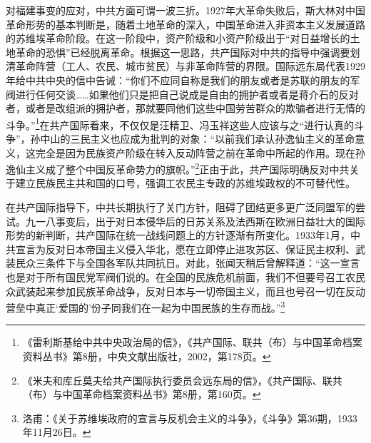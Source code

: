 对福建事变的应对，中共方面可谓一波三折。1927年大革命失败后，斯大林对中国革命形势的基本判断是，随着土地革命的深入，中国革命进入非资本主义发展道路的苏维埃革命阶段。在这一阶段中，资产阶级和小资产阶级出于“对日益增长的土地革命的恐惧”已经脱离革命。根据这一思路，共产国际对中共的指导中强调要划清革命阵营（工人、农民、城市贫民）与非革命阵营的界限。国际远东局代表1929年给中共中央的信中告诫：“你们不应同自称是我们的朋友或者是苏联的朋友的军阀进行任何交谈……如果他们只是把自己说成是自由的拥护者或者是蒋介石的反对者，或者是改组派的拥护者，那就要同他们这些中国劳苦群众的欺骗者进行无情的斗争。”\footnote{《雷利斯基给中共中央政治局的信》，《共产国际、联共（布）与中国革命档案资料丛书》第8册，中央文献出版社，2002，第178页。}在共产国际看来，不仅仅是汪精卫、冯玉祥这些人应该与之“进行认真的斗争”，孙中山的三民主义也应成为批判的对象：“以前我们承认孙逸仙主义的革命意义，这完全是因为民族资产阶级在转入反动阵营之前在革命中所起的作用。现在孙逸仙主义成了整个中国反革命势力的旗帜。”\footnote{《米夫和库丘莫夫给共产国际执行委员会远东局的信》，《共产国际、联共（布）与中国革命档案资料丛书》第8册，第160页。}正由于此，共产国际明确反对中共关于建立民族民主共和国的口号，强调工农民主专政的苏维埃政权的不可替代性。


在共产国际指导下，中共长期执行了关门方针，阻碍了团结更多更广泛同盟军的尝试。九一八事变后，出于对日本侵华后的日苏关系及法西斯在欧洲日益壮大的国际形势的新判断，共产国际在统一战线问题上的方针逐渐有所变化。1933年1月，中共宣言为反对日本帝国主义侵入华北，愿在立即停止进攻苏区、保证民主权利、武装民众三条件下与全国各军队共同抗日。对此，张闻天稍后曾解释道：“这一宣言也是对于所有国民党军阀们说的。在全国的民族危机前面，我们不但要号召工农民众武装起来参加民族革命战争，反对日本与一切帝国主义，而且也号召一切在反动营垒中真正‘爱国的’份子同我们在一起为中国民族的生存而战。”\footnote{洛甫：《关于苏维埃政府的宣言与反机会主义的斗争》，《斗争》第36期，1933年11月26日。}



